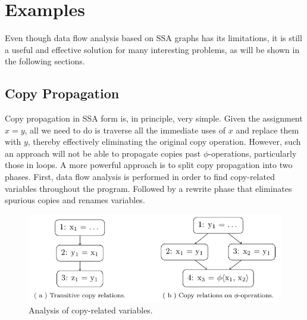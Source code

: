 \section{Examples}
\label{novillo:sec:examples}

Even though data flow analysis based on SSA graphs has its limitations, it is
still a useful and effective solution for many interesting problems, as will be
shown in the following sections.

\subsection{Copy Propagation}
\label{novillo:sec:copy-prop}

Copy propagation in SSA form is, in principle, very simple.  Given the
assignment \linebreak $x = y$, all we need to do is traverse all the immediate
uses of $x$ and replace them with $y$, thereby effectively eliminating the
original copy operation. However, such an approach will not be able to propagate
copies past $\phi$-operations, particularly those in loops. A more powerful
approach is to split copy propagation into two phases. First, data flow analysis
is performed in order to find copy-related variables throughout the program.
Followed by a rewrite phase that eliminates spurious copies and renames
variables.

\begin{figure}[b!]
  \begin{center}
    \includegraphics{copy_propagation}
    \subfigure{\label{novillo:fig:copy_propagation:a}}
    \subfigure{\label{novillo:fig:copy_propagation:b}}
  \end{center}
  \vspace{-1em}
  \caption{Analysis of copy-related variables.}
  \label{novillo:fig:copy_propagation}
\end{figure}

